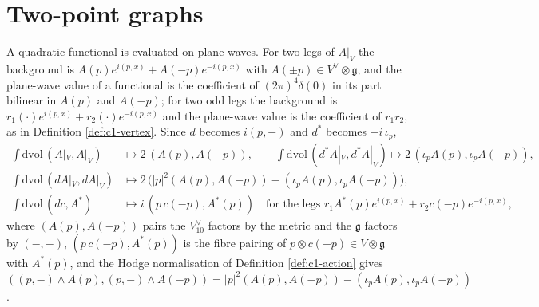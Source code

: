 \section{Two-point graphs}

A quadratic functional is evaluated on plane waves. For two legs of $A|_V$ the background is $A(p)e^{i(p,x)}+A(-p)e^{-i(p,x)}$ with $A(\pm p)\in V^\vee\otimes\mathfrak g$, and the plane-wave value of a functional is the coefficient of $(2\pi)^4\delta(0)$ in its part bilinear in $A(p)$ and $A(-p)$; for two odd legs the background is $r_1(\cdot)e^{i(p,x)}+r_2(\cdot)e^{-i(p,x)}$ and the plane-wave value is the coefficient of $r_1r_2$, as in Definition \ref{def:c1-vertex}. Since $d$ becomes $i(p,-)$ and $d^*$ becomes $-i\,\iota_p$,
\begin{equation}
\begin{aligned}
\int\mathrm{dvol}\,(A|_V,A|_V)&\mapsto2\,(A(p),A(-p)),\qquad \int\mathrm{dvol}\,(d^*A|_V,d^*A|_V)\mapsto2\,(\iota_pA(p),\iota_pA(-p)),\\
\int\mathrm{dvol}\,(dA|_V,dA|_V)&\mapsto2\,\big(|p|^2(A(p),A(-p))-(\iota_pA(p),\iota_pA(-p))\big),\\
\int\mathrm{dvol}\,(dc,A^*)&\mapsto i\,(p\,c(-p),A^*(p))\quad\text{for the legs }r_1A^*(p)e^{i(p,x)}+r_2c(-p)e^{-i(p,x)},
\end{aligned}
\label{eq:c4-pw}
\end{equation}
where $(A(p),A(-p))$ pairs the $V_{10}^\vee$ factors by the metric and the $\mathfrak g$ factors by $(-,-)$, $(p\,c(-p),A^*(p))$ is the fibre pairing of $p\otimes c(-p)\in V\otimes\mathfrak g$ with $A^*(p)$, and the Hodge normalisation of Definition \ref{def:c1-action} gives $((p,-)\wedge A(p),(p,-)\wedge A(-p))=|p|^2(A(p),A(-p))-(\iota_pA(p),\iota_pA(-p))$.


